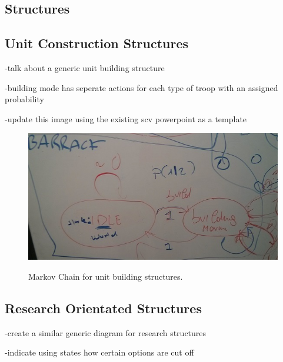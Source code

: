 \subsection{Structures}

\subsection{Unit Construction Structures}

-talk about a generic unit building structure

-building mode has seperate actions for each type of troop with an assigned probability

-update this image using the existing scv powerpoint as a template

\begin{figure}
\centering
\includegraphics[scale=0.8, trim = 0cm 0cm 0cm 0cm]{diagrams/barracks}
\label{fig:barracks_diagram}
\caption{Markov Chain for unit building structures.}
\end{figure}

\subsection{Research Orientated Structures}

-create a similar generic diagram for research structures

-indicate using states how certain options are cut off